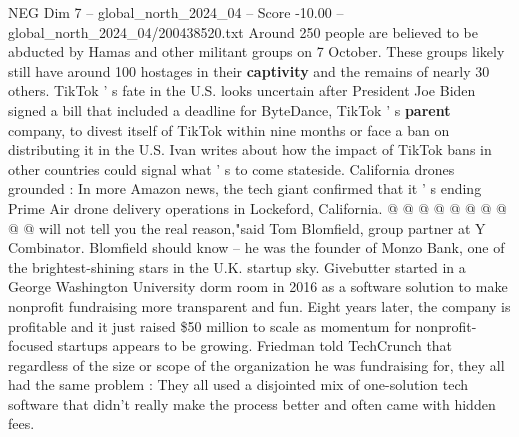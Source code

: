 \begin{textsample}{NEG Dim 7 – global\_north\_2024\_04 – Score -10.00 – global\_north\_2024\_04/200438520.txt}
Around 250 people are believed to be abducted by Hamas and other militant groups on 7 October.
These groups likely still have around 100 hostages in their \textbf{captivity} and the remains of nearly 30 others.
TikTok ' s fate in the U.S. looks uncertain after President Joe Biden signed a bill that included a deadline for ByteDance, TikTok ' s \textbf{parent} company, to divest itself of TikTok within nine months or face a ban on distributing it in the U.S.
Ivan writes about how the impact of TikTok bans in other countries could signal what ' s to come stateside.
California drones grounded : In more Amazon news, the tech giant confirmed that it ' s ending Prime Air drone delivery operations in Lockeford, California. @ @ @ @ @ @ @ @ @ @ will not tell you the real reason,"said Tom Blomfield, group partner at Y Combinator.
Blomfield should know -- he was the founder of Monzo Bank, one of the brightest-shining stars in the U.K. startup sky.
Givebutter started in a George Washington University dorm room in 2016 as a software solution to make nonprofit fundraising more transparent and fun.
Eight years later, the company is profitable and it just raised \$50 million to scale as momentum for nonprofit-focused startups appears to be growing.
Friedman told TechCrunch that regardless of the size or scope of the organization he was fundraising for, they all had the same problem : They all used a disjointed mix of one-solution tech software that didn't really make the process better and often came with hidden fees.

\end{textsample}

